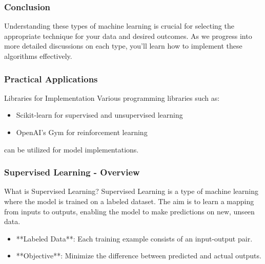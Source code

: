 \documentclass[aspectratio=169]{beamer}
\begin{document}
\begin{frame}[fragile]
    \frametitle{Conclusion}
    Understanding these types of machine learning is crucial for selecting the appropriate technique for your data and desired outcomes. As we progress into more detailed discussions on each type, you'll learn how to implement these algorithms effectively.
\end{frame}

\begin{frame}[fragile]
    \frametitle{Practical Applications}
    \begin{block}{Libraries for Implementation}
        Various programming libraries such as:
        \begin{itemize}
            \item Scikit-learn for supervised and unsupervised learning
            \item OpenAI's Gym for reinforcement learning
        \end{itemize}
        can be utilized for model implementations.
    \end{block}
\end{frame}

\begin{frame}[fragile]
  \frametitle{Supervised Learning - Overview}
  \begin{block}{What is Supervised Learning?}
    Supervised Learning is a type of machine learning where the model is trained on a labeled dataset. 
    The aim is to learn a mapping from inputs to outputs, enabling the model to make predictions on new, unseen data.
  \end{block}
  
  \begin{itemize}
    \item **Labeled Data**: Each training example consists of an input-output pair.
    \item **Objective**: Minimize the difference between predicted and actual outputs.
  \end{itemize}
\end{frame}
\end{document}
